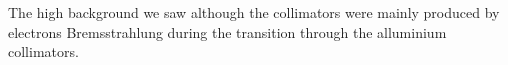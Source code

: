    The high background we saw although the collimators were mainly produced by electrons Bremsstrahlung during the transition through the alluminium collimators.

   